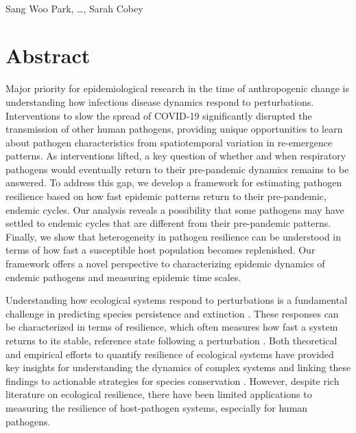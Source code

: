 \documentclass[12pt]{article}
\date{\today}
\begin{document}
\begin{flushleft}{
	\Large
	\textbf{}
}
\newline
\\
Sang Woo Park, \dots, Sarah Cobey
\\
\bigskip
\end{flushleft}

\section*{Abstract}

Major priority for epidemiological research in the time of anthropogenic change is understanding how infectious disease dynamics respond to perturbations.
Interventions to slow the spread of COVID-19 significantly disrupted the transmission of other human pathogens, providing unique opportunities to learn about pathogen characteristics from spatiotemporal variation in re-emergence patterns. 
As interventions lifted, a key question of whether and when respiratory pathogens would eventually return to their pre-pandemic dynamics remains to be answered. 
To address this gap, we develop a framework for estimating pathogen resilience based on how fast epidemic patterns return to their pre-pandemic, endemic cycles.
Our analysis reveals a possibility that some pathogens may have settled to endemic cycles that are different from their pre-pandemic patterns.
Finally, we show that heterogeneity in pathogen resilience can be understood in terms of how fast a susceptible host population becomes replenished.
Our framework offers a novel perspective to characterizing epidemic dynamics of endemic pathogens and measuring epidemic time scales.

\pagebreak

Understanding how ecological systems respond to perturbations is a fundamental challenge in predicting species persistence and extinction \citep{bender1984perturbation,ives2007stability,scheffer2009early}.
These responses can be characterized in terms of resilience, which often measures how fast a system returns to its stable, reference state following a perturbation \citep{pimm1979structure, neubert1997alternatives,gunderson2000ecological,dakos2022ecological}.
Both theoretical and empirical efforts to quantify resilience of ecological systems have provided key insights for understanding the dynamics of complex systems and linking these findings to actionable strategies for species conservation \citep{chambers2019operationalizing}.
However, despite rich literature on ecological resilience, there have been limited applications to measuring the resilience of host-pathogen systems, especially for human pathogens.
\end{document}
